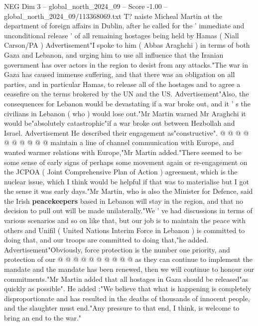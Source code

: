 \begin{textsample}{NEG Dim 3 – global\_north\_2024\_09 – Score -1.00 – global\_north\_2024\_09/113368069.txt}  \label{ex:f3_neg_291}
T? naiste Micheal Martin at the department of foreign affairs in Dublin, after he called for the ' immediate and unconditional release ' of all remaining hostages being held by Hamas ( Niall Carson/PA ) Advertisement"I spoke to him ( Abbas Araghchi ) in terms of both Gaza and Lebanon, and urging him to use all influence that the Iranian government has over actors in the region to desist from any attacks."The war in Gaza has caused immense suffering, and that there was an obligation on all parties, and in particular Hamas, to release all of the hostages and to agree a ceasefire on the terms brokered by the UN and the US.
Advertisement"Also, the consequences for Lebanon would be devastating if a war broke out, and it ' s the civilians in Lebanon ( who ) would lose out."Mr Martin warned Mr Araghchi it would be"absolutely catastrophic"if a war broke out between Hezbollah and Israel.
Advertisement He described their engagement as"constructive". @ @ @ @ @ @ @ @ @ @ maintain a line of channel communication with Europe, and wanted warmer relations with Europe,"Mr Martin added."There seemed to be some sense of early signs of perhaps some movement again or re-engagement on the JCPOA ( Joint Comprehensive Plan of Action ) agreement, which is the nuclear issue, which I think would be helpful if that was to materialise but I got the sense it was early days."Mr Martin, who is also the Minister for Defence, said the Irish \textbf{peacekeepers} based in Lebanon will stay in the region, and that no decision to pull out will be made unilaterally."We ' ve had discussions in terms of various scenarios and so on like that, but our job is to maintain the peace with others and Unifil ( United Nations Interim Force in Lebanon ) is committed to doing that, and our troops are committed to doing that,"he added.
Advertisement"Obviously, force protection is the number one priority, and protection of our @ @ @ @ @ @ @ @ @ @ as they can continue to implement the mandate and the mandate has been renewed, then we will continue to honour our commitments."Mr Martin added that all hostages in Gaza should be released"as quickly as possible".
He added :"We believe that what is happening is completely disproportionate and has resulted in the deaths of thousands of innocent people, and the slaughter must end."Any pressure to that end, I think, is welcome to bring an end to the war."

\end{textsample}
